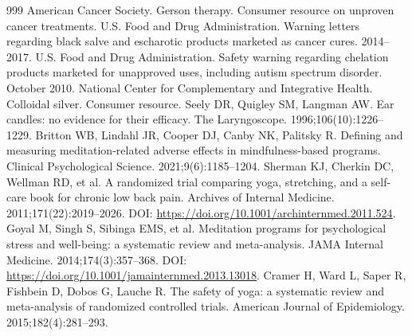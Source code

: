 \documentclass[11pt,oneside]{book}
\begin{document}
\begin{thebibliography}{999}
American Cancer Society. Gerson therapy. Consumer resource on unproven cancer treatments.
U.S. Food and Drug Administration. Warning letters regarding black salve and escharotic products marketed as cancer cures. 2014--2017.
U.S. Food and Drug Administration. Safety warning regarding chelation products marketed for unapproved uses, including autism spectrum disorder. October 2010.
National Center for Complementary and Integrative Health. Colloidal silver. Consumer resource.
Seely DR, Quigley SM, Langman AW. Ear candles: no evidence for their efficacy. The Laryngoscope. 1996;106(10):1226--1229.
Britton WB, Lindahl JR, Cooper DJ, Canby NK, Palitsky R. Defining and measuring meditation-related adverse effects in mindfulness-based programs. Clinical Psychological Science. 2021;9(6):1185--1204.
Sherman KJ, Cherkin DC, Wellman RD, et al. A randomized trial comparing yoga, stretching, and a self-care book for chronic low back pain. Archives of Internal Medicine. 2011;171(22):2019--2026. DOI: \url{https://doi.org/10.1001/archinternmed.2011.524}.
Goyal M, Singh S, Sibinga EMS, et al. Meditation programs for psychological stress and well-being: a systematic review and meta-analysis. JAMA Internal Medicine. 2014;174(3):357--368. DOI: \url{https://doi.org/10.1001/jamainternmed.2013.13018}.
Cramer H, Ward L, Saper R, Fishbein D, Dobos G, Lauche R. The safety of yoga: a systematic review and meta-analysis of randomized controlled trials. American Journal of Epidemiology. 2015;182(4):281--293.


\end{thebibliography}
\end{document}
